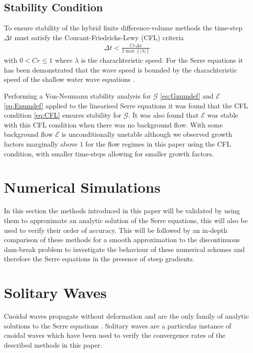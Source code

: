 \documentclass[SingleSpace,12pt,Journal]{Serre_ASCE}
\begin{document}
\subsection{Stability Condition} 
To ensure stability of the hybrid finite difference-volume methods the time-step $\Delta t$ must satisfy the Courant-Friedrichs-Lewy (CFL) criteria \cite{Harten-etal-1983-357}
%
\begin{gather}
\label{eq:CFL}
\Delta t < \frac{Cr \Delta x}{2\max \left\lbrace |\lambda| \right\rbrace}
\end{gather}
%
 with $0<Cr\le 1$ where $\lambda$ is the charachteristic speed. For the Serre equations it has been demonstrated that the wave speed is bounded by the charachteristic speed of the shallow water wave equations \cite{Hank-etal-2010-2034,Zoppou-etal-2017}. 
 
 Performing a Von-Neumann stability analysis for $\mathcal{G}$ \eqref{eq:Gnumdef} and $\mathcal{E}$ \eqref{eq:Enumdef} applied to the linearised Serre equations \cite{Zoppou-etal-2017} it was found that the CFL condition \eqref{eq:CFL} ensures stability for $\mathcal{G}$. It was also found that $\mathcal{E}$ was stable with this CFL condition when there was no background flow. With some background flow $\mathcal{E}$ is unconditionally unstable although we observed growth factors marginally above $1$ for the flow regimes in this paper using the CFL condition, with smaller time-steps allowing for smaller growth factors.
 

\section{Numerical Simulations}
\label{section:Numerical Simulations}
In this section the methods introduced in this paper will be validated by using them to approximate an analytic solution of the Serre equations, this will also be used to verify their order of accuracy. This will be followed by an in-depth comparison of these methods for a smooth approximation to the discontinuous dam-break problem to investigate the behaviour of these numerical schemes and therefore the Serre equations in the presence of steep gradients.

\section{Solitary Waves}
\label{section:Convergence Rate}
Cnoidal waves propagate without deformation and are the only family of analytic solutions to the Serre equations \cite{Carter-Cienfuegos-2010-259}. Solitary waves are a particular instance of cnoidal waves which have been used to verify the convergence rates of the described methods in this paper. 
\end{document}
